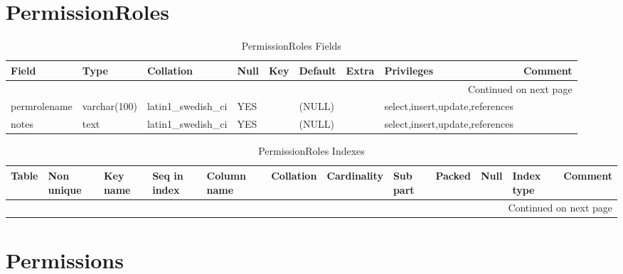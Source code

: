 \documentclass[tablesignature,landscape]{scrartcl}
\begin{document}
\section{PermissionRoles}
\label{sec-14}


\begin{longtable}{|l|l|l|l|l|l|l|l|l|}
\caption{PermissionRoles Fields} \label{tbl:permissionrolesfields}\\
\hline
 Field         &  Type          &  Collation                &  Null  &  Key  &  Default  &  Extra              &  Privileges                       &  Comment \\
\hline
\endhead
\hline\multicolumn{9}{r}{Continued on next page}\
\endfoot
\endlastfoot
\hline
 permroleid    &  int(11)       &  NULL                     &        &  PRI  &  (NULL)   &  auto\_{}increment  &  select,insert,update,references  &           \\
 permrolename  &  varchar(100)  &  latin1\_{}swedish\_{}ci  &  YES   &       &  (NULL)   &                     &  select,insert,update,references  &           \\
 notes         &  text          &  latin1\_{}swedish\_{}ci  &  YES   &       &  (NULL)   &                     &  select,insert,update,references  &           \\
\hline
\end{longtable}


\begin{longtable}{|l|l|l|l|l|l|l|l|l|l|l|l|}
\caption{PermissionRoles Indexes} \label{tbl:permissionrolesindexes}\\
\hline
 Table            &  Non unique  &  Key name  &  Seq in index  &  Column name  &  Collation  &  Cardinality  &  Sub part  &  Packed  &  Null  &  Index type  &  Comment \\
\hline
\endhead
\hline\multicolumn{12}{r}{Continued on next page}\
\endfoot
\endlastfoot
\hline
 PermissionRoles  &           0  &  PRIMARY   &             1  &  permroleid   &  A          &            3  &  (NULL)    &  (NULL)  &        &  BTREE       &           \\
\hline
\end{longtable}
\section{Permissions}
\label{sec-15}
\end{document}
